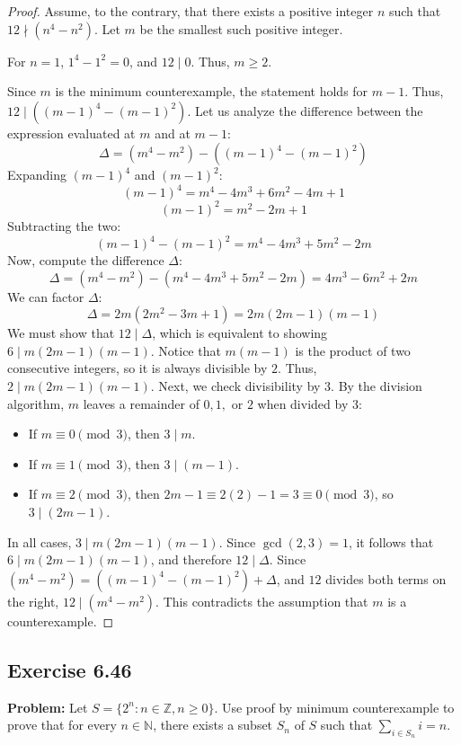 \documentclass[11pt, a4paper]{article}
\theoremstyle{definition}
\theoremstyle{remark}
\newcommand{\N}{\mathbb{N}}
\newcommand{\Z}{\mathbb{Z}}
\begin{document}
\begin{proof}
Assume, to the contrary, that there exists a positive integer $n$ such that $12 \nmid (n^4 - n^2)$. Let $m$ be the smallest such positive integer.

For $n=1$, $1^4 - 1^2 = 0$, and $12 \mid 0$. Thus, $m \ge 2$.

Since $m$ is the minimum counterexample, the statement holds for $m-1$. Thus, $12 \mid ((m-1)^4 - (m-1)^2)$. 
Let us analyze the difference between the expression evaluated at $m$ and at $m-1$:
\[
\Delta = (m^4 - m^2) - ((m-1)^4 - (m-1)^2)
\]
Expanding $(m-1)^4$ and $(m-1)^2$:
\[
(m-1)^4 = m^4 - 4m^3 + 6m^2 - 4m + 1
\]
\[
(m-1)^2 = m^2 - 2m + 1
\]
Subtracting the two:
\[
(m-1)^4 - (m-1)^2 = m^4 - 4m^3 + 5m^2 - 2m
\]
Now, compute the difference $\Delta$:
\[
\Delta = (m^4 - m^2) - (m^4 - 4m^3 + 5m^2 - 2m) = 4m^3 - 6m^2 + 2m
\]
We can factor $\Delta$:
\[
\Delta = 2m(2m^2 - 3m + 1) = 2m(2m-1)(m-1)
\]
We must show that $12 \mid \Delta$, which is equivalent to showing $6 \mid m(2m-1)(m-1)$.
Notice that $m(m-1)$ is the product of two consecutive integers, so it is always divisible by $2$. Thus, $2 \mid m(2m-1)(m-1)$.
Next, we check divisibility by $3$. By the division algorithm, $m$ leaves a remainder of $0, 1,$ or $2$ when divided by $3$:
\begin{itemize}
    \item If $m \equiv 0 \pmod 3$, then $3 \mid m$.
    \item If $m \equiv 1 \pmod 3$, then $3 \mid (m-1)$.
    \item If $m \equiv 2 \pmod 3$, then $2m-1 \equiv 2(2)-1 = 3 \equiv 0 \pmod 3$, so $3 \mid (2m-1)$.
\end{itemize}
In all cases, $3 \mid m(2m-1)(m-1)$. Since $\gcd(2,3)=1$, it follows that $6 \mid m(2m-1)(m-1)$, and therefore $12 \mid \Delta$.
Since $(m^4 - m^2) = ((m-1)^4 - (m-1)^2) + \Delta$, and $12$ divides both terms on the right, $12 \mid (m^4 - m^2)$. This contradicts the assumption that $m$ is a counterexample.
\end{proof}

\subsection{Exercise 6.46}
\textbf{Problem:} Let $S = \{2^n : n \in \Z, n \ge 0\}$. Use proof by minimum counterexample to prove that for every $n \in \N$, there exists a subset $S_n$ of $S$ such that $\sum_{i \in S_n} i = n$.
\end{document}
